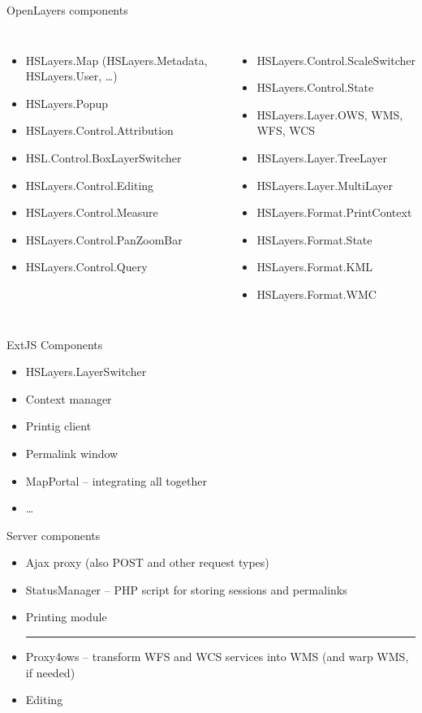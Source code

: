 \documentclass[xcolor=dvipsnames]{beamer}
\begin{document}
\begin{frame}{OpenLayers components}
\scriptsize
\begin{columns}
\begin{itemize}
    \item HSLayers.Map (HSLayers.Metadata, HSLayers.User, \dots)
    \item HSLayers.Popup
    \item HSLayers.Control.Attribution
    \item HSL.Control.BoxLayerSwitcher
    \item HSLayers.Control.Editing
    \item HSLayers.Control.Measure
    \item HSLayers.Control.PanZoomBar
    \item HSLayers.Control.Query
\end{itemize} 
\begin{itemize}
    \item HSLayers.Control.ScaleSwitcher
    \item HSLayers.Control.State
    \item HSLayers.Layer.OWS, WMS, WFS, WCS
    \item HSLayers.Layer.TreeLayer
    \item HSLayers.Layer.MultiLayer
    \item HSLayers.Format.PrintContext
    \item HSLayers.Format.State
    \item HSLayers.Format.KML
    \item HSLayers.Format.WMC
\end{itemize}
\end{columns}
\end{frame}

\begin{frame}{ExtJS Components}
\begin{itemize}
    \item HSLayers.LayerSwitcher
    \item Context manager
    \item Printig client
    \item Permalink window
    \item MapPortal -- integrating all together
    \item \dots
\end{itemize}
\end{frame}

\begin{frame}{Server components}
\begin{itemize}
    \item Ajax proxy (also POST and other request types)
    \item StatusManager -- PHP script for storing sessions and permalinks
    \item Printing module
    \hrule
    \item Proxy4ows -- transform WFS and WCS services into WMS (and warp WMS, if
    needed)
    \item Editing
\end{itemize}
\end{frame}
\end{document}
